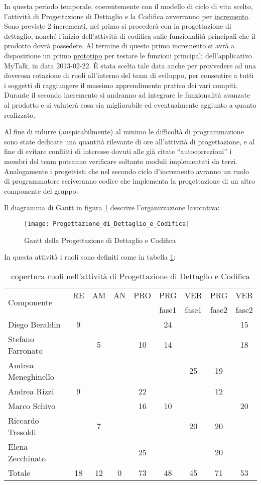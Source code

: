 In questa periodo temporale, coerentemente con il modello di ciclo di vita scelto, l'attività di Progettazione di Dettaglio e la Codifica avverranno per \underline{incremento}.
Sono previste 2 incrementi, nel primo si procederà con la progettazione di dettaglio, nonché l'inizio dell'attività di codifica sulle funzionalità principali che il prodotto dovrà possedere.
Al termine di questo primo incremento si avrà a disposizione un primo \underline{prototipo} per testare le funzioni principali dell'applicativo MyTalk, in data 2013-02-22.
È stata scelta tale data anche per provvedere ad una doverosa rotazione di ruoli all'interno del team di sviluppo, per consentire a tutti i soggetti di raggiungere il massimo apprendimento pratico dei vari compiti.
Durante il secondo incremento si andranno ad integrare le funzionalità avanzate al prodotto e si valuterà cosa sia migliorabile ed eventualmente aggiunto a quanto realizzato.

Al fine di ridurre (auspicabilmente) al minimo le difficoltà di programmazione sono state dedicate una quantità rilevante di ore all'attività di progettazione, e al fine di evitare conflitti di interesse dovuti alle già citate ``autocorrezioni'' i membri del team potranno verificare soltanto moduli implementati da terzi. Analogamente i progettisti che nel secondo ciclo d'incremento avranno un ruolo di programmatore scriveranno codice che implementa la progettazione di un altro componente del gruppo.

Il diagramma di Gantt in figura \ref{fig:gantdc} descrive l'organizzazione lavorativa:

\begin{figure}[h!]
  \texttt{[image: Progettazione\_di\_Dettaglio\_e\_Codifica]}
\caption{Gantt della Progettazione di Dettaglio e Codifica}\label{fig:gantdc}
\end{figure}

In questa attività i ruoli sono definiti come in tabella \ref{tab:ruolidc}:

\begin{table}[h!]
\centering
\begin{tabular}{|l|c|c|c|c|c|c|c|c|}
\hline
\multirow{2}{*}{Componente}& RE& AM& AN& PRO& PRG&VER& PRG& VER \\
					      &    &     &      &        & fase1&fase1&fase2&fase2\\
\hline
Diego Beraldin & 9& & & & 24& & & 15\\
Stefano Farronato & & 5& & 10&14 & & & 18\\
Andrea Meneghinello & & & & & & 25& 19& \\
Andrea Rizzi & 9& & & 22& & & 12& \\
Marco Schivo & & & & 16& 10& & & 20\\
Riccardo Tresoldi & & 7& & & & 20& 20& \\
Elena Zecchinato & & & & 25& & & 20& \\
\hline
Totale & 18& 12& 0& 73& 48& 45& 71& 53\\
\hline
\end{tabular}
\caption{copertura ruoli nell'attività di Progettazione di Dettaglio e Codifica}\label{tab:ruolidc}
\end{table}
\clearpage

